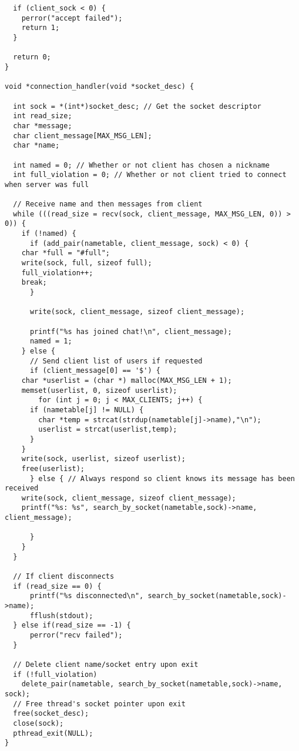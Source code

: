 \documentclass[titlepage, 14pt]{article}
\begin{document}
\begin{verbatim}
  if (client_sock < 0) {
    perror("accept failed");
    return 1;
  }
  
  return 0;
}

void *connection_handler(void *socket_desc) {

  int sock = *(int*)socket_desc; // Get the socket descriptor
  int read_size;
  char *message;
  char client_message[MAX_MSG_LEN];
  char *name;

  int named = 0; // Whether or not client has chosen a nickname
  int full_violation = 0; // Whether or not client tried to connect when server was full
  
  // Receive name and then messages from client
  while (((read_size = recv(sock, client_message, MAX_MSG_LEN, 0)) > 0)) {
    if (!named) {
      if (add_pair(nametable, client_message, sock) < 0) {
	char *full = "#full";
	write(sock, full, sizeof full);
	full_violation++;
	break;
      }

      write(sock, client_message, sizeof client_message);

      printf("%s has joined chat!\n", client_message);
      named = 1;
    } else {
      // Send client list of users if requested
      if (client_message[0] == '$') {
	char *userlist = (char *) malloc(MAX_MSG_LEN + 1);
	memset(userlist, 0, sizeof userlist);
        for (int j = 0; j < MAX_CLIENTS; j++) {
	  if (nametable[j] != NULL) {
	    char *temp = strcat(strdup(nametable[j]->name),"\n");
	    userlist = strcat(userlist,temp);	   
	  }
	}
	write(sock, userlist, sizeof userlist);
	free(userlist);	
      } else { // Always respond so client knows its message has been received
	write(sock, client_message, sizeof client_message);
	printf("%s: %s", search_by_socket(nametable,sock)->name, client_message);
	
      }
    }
  }

  // If client disconnects
  if (read_size == 0) {
      printf("%s disconnected\n", search_by_socket(nametable,sock)->name);
      fflush(stdout);
  } else if(read_size == -1) {
      perror("recv failed");
  }

  // Delete client name/socket entry upon exit
  if (!full_violation)
    delete_pair(nametable, search_by_socket(nametable,sock)->name, sock);
  // Free thread's socket pointer upon exit
  free(socket_desc);
  close(sock);
  pthread_exit(NULL); 
}
\end{verbatim}
\end{document}
